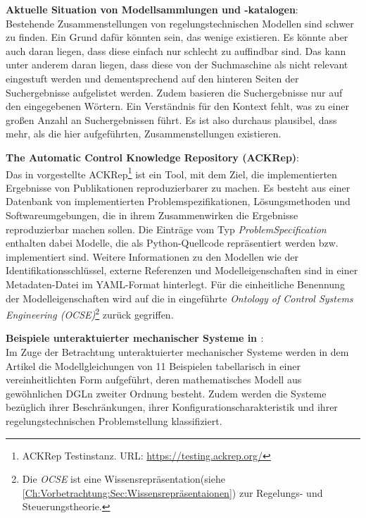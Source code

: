 \textbf{Aktuelle Situation von Modellsammlungen und -katalogen}: \\
Bestehende Zusammenstellungen von regelungstechnischen Modellen sind schwer zu finden. Ein Grund dafür könnten sein, das wenige existieren. Es könnte aber auch daran liegen, dass diese einfach nur schlecht zu auffindbar sind. Das kann unter anderem daran liegen, dass diese von der Suchmaschine als nicht relevant eingestuft werden und dementsprechend auf den hinteren Seiten der Suchergebnisse aufgelistet werden. Zudem basieren die Suchergebnisse nur auf den eingegebenen Wörtern. Ein Verständnis für den Kontext fehlt, was zu einer großen Anzahl an Suchergebnissen führt. Es ist also durchaus plausibel, dass mehr, als die hier aufgeführten, Zusammenstellungen existieren. 

\textbf{The Automatic Control Knowledge Repository (ACKRep)}:\\
Das in \cite{KNHE20a} vorgestellte ACKRep\footnote{ACKRep Testinstanz. \tiny{URL}\normalsize: \url{https://testing.ackrep.org/}} ist ein Tool, mit dem Ziel, die implementierten Ergebnisse von Publikationen reproduzierbarer zu machen. Es besteht aus einer Datenbank von implementierten Problemspezifikationen, Lösungsmethoden und Softwareumgebungen, die in ihrem Zusammenwirken die Ergebnisse reproduzierbar machen sollen. Die Einträge vom Typ \textit{ProblemSpecification} enthalten dabei Modelle, die als Python-Quellcode repräsentiert werden bzw. implementiert sind. Weitere Informationen zu den Modellen wie der Identifikationsschlüssel, externe Referenzen und Modelleigenschaften sind in einer Metadaten-Datei im YAML-Format hinterlegt. Für die einheitliche Benennung der Modelleigenschaften wird auf die in \cite{KNHE20b} eingeführte \textit{Ontology of Control Systems Engineering (OCSE)}\footnote{Die \textit{OCSE} ist eine Wissensrepräsentation(siehe \autoref{Ch:Vorbetrachtung:Sec:Wissensrepräsentaionen}) zur Regelungs- und Steuerungstheorie.} zurück gegriffen.

\textbf{Beispiele unteraktuierter mechanischer Systeme in \cite{LIYU13}}:\\
Im Zuge der Betrachtung unteraktuierter mechanischer Systeme werden in dem Artikel die Modellgleichungen von 11 Beispielen tabellarisch in einer vereinheitlichten Form aufgeführt, deren mathematisches Modell aus gewöhnlichen DGLn zweiter Ordnung besteht. Zudem werden die Systeme bezüglich ihrer Beschränkungen, ihrer Konfigurationscharakteristik und ihrer regelungstechnischen Problemstellung klassifiziert.


